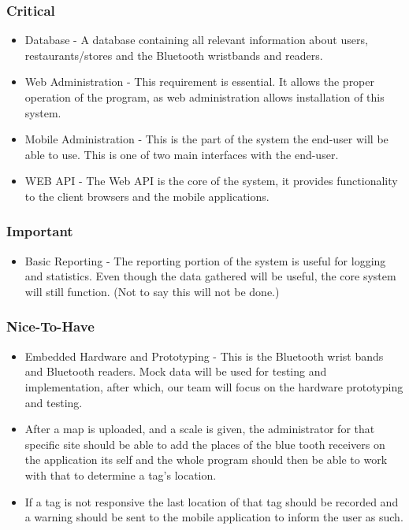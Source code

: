 \documentclass[11pt,titlepage]{article} %
\begin{document}
	\subsubsection{Critical}
\begin{itemize}
\item Database - A database containing all relevant information about users, restaurants/stores and the Bluetooth wristbands and readers.
\item Web Administration - This requirement is essential. It allows the proper operation of the program, as web administration allows installation of this system.
\item Mobile Administration - This is the part of the system the end-user will be able to use. This is one of two main interfaces with the end-user.
\item WEB API - The Web API is the core of the system, it provides functionality to the client browsers and the mobile applications.
\end{itemize}

	\subsubsection{Important}
\begin{itemize}
\item Basic Reporting - The reporting portion of the system is useful for logging and statistics. Even though the data gathered will be useful, the core system will still function. (Not to say this will not be done.)
\end{itemize}

	\subsubsection{Nice-To-Have}
\begin{itemize}
\item Embedded Hardware and Prototyping - This is the Bluetooth wrist bands and Bluetooth readers. Mock data will be used for testing and implementation, after which, our team will focus on the hardware prototyping and testing.

\item After a map is uploaded, and a scale is given, the administrator for that specific site should be able to add the places of the blue tooth receivers on the application its self and the whole program should then be able to work with that to determine a tag's location.

\item If a tag is not responsive the last location of that tag should be recorded and a warning should be sent to the mobile application to inform the user as such.


\end{itemize}
\end{document}
